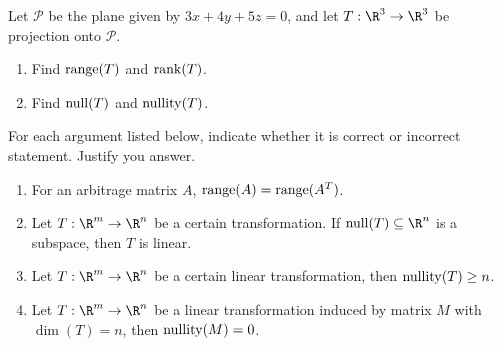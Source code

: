 \begin{exercises}
\begin{problist}
		\prob Let $\mathcal P$ be the plane given by $3x+4y+5z=0$, and let $T:\R^3\to\R^3$ be projection onto $\mathcal P$. 
		\begin{enumerate}
		    \item Find $\operatorname{range}(T)$ and $\operatorname{rank}(T)$.
		    \item Find $\operatorname{null}(T)$ and $\operatorname{nullity}(T)$.
		\end{enumerate}
		\prob For each argument listed below, indicate whether it is correct or incorrect statement. Justify you answer.
		\begin{enumerate}
		    \item For an arbitrage matrix $A$, $\operatorname{range}(A)=\operatorname{range}(A^T)$.
		    \item Let $T:\R^m\to\R^n$ be a certain transformation. If $\Null(T)\subseteq \R^n$ is a subspace, then $T$ is linear.
		    \item Let $T:\R^m\to\R^n$ be a certain linear transformation, then $\operatorname{nullity}(T) \geq n$.
		    \item Let $T:\R^m\to\R^n$ be a linear transformation induced by matrix $M$ with $\dim(T) = n$, then $\operatorname{nullity}(M) = 0$.
		\end{enumerate}

	\end{problist}
\end{exercises}
